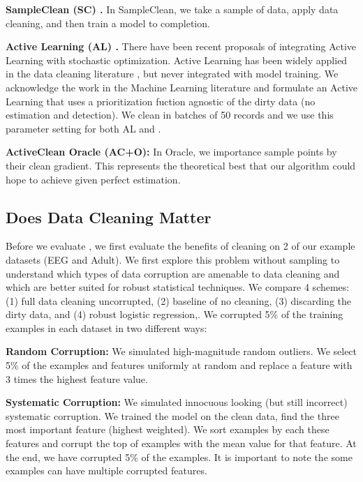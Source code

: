 \vspace{0.5em}

\noindent\textbf{SampleClean (SC) \cite{wang1999sample}. } In SampleClean, we take a sample of data, apply data cleaning, and then train a model to completion.

\vspace{0.5em}

\noindent\textbf{Active Learning (AL) \cite{guillory2009active}. } There have been recent proposals of integrating Active Learning with stochastic optimization. Active Learning has been widely applied in the data cleaning literature \cite{gokhale2014corleone}, but never integrated with model training. We acknowledge the work in the Machine Learning literature and formulate an Active Learning that uses a prioritization fuction agnostic of the dirty data (no estimation and detection). We clean in batches of 50 records and we use this parameter setting for both AL and \sys.

\vspace{0.5em}

\noindent\textbf{ActiveClean Oracle (AC+O): } In \sys Oracle, we importance sample points by their clean gradient. This represents the theoretical best that our algorithm could hope to achieve given perfect estimation.

\subsection{Does Data Cleaning Matter}
Before we evaluate \sys, we first evaluate the benefits of cleaning on 2 of our example datasets (EEG and Adult).
We first explore this problem without sampling to understand which types of data corruption are amenable to data cleaning and which are better suited for robust statistical techniques.
We compare 4 schemes: (1) full data cleaning uncorrupted, (2) baseline of no cleaning, (3) discarding the dirty data, and (4) robust logistic regression,. We corrupted 5\% of the training examples in each dataset in two different ways:

\vspace{0.5em}

\noindent\textbf{Random Corruption: } We simulated high-magnitude random outliers. We select 5\% of the examples and features uniformly at random and replace a feature with 3 times the highest feature value.

\vspace{0.5em}

\noindent\textbf{Systematic Corruption: } We simulated innocuous looking (but still incorrect) systematic corruption. We trained the model on the clean data, find the three most important feature (highest weighted). We sort examples by each these features and corrupt the top of examples with the mean value for that feature. 
At the end, we have corrupted 5\% of the examples.
It is important to note the some examples can have multiple corrupted features.

